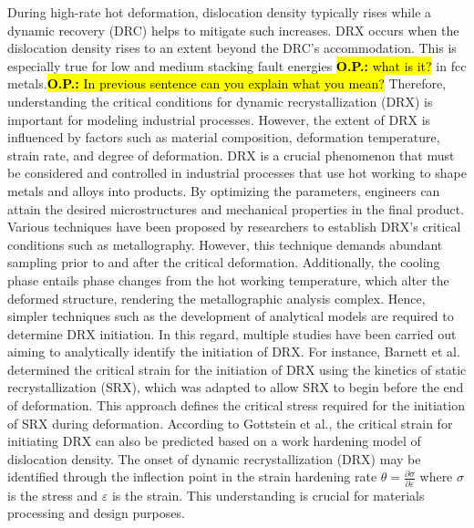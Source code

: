 \documentclass[metals,article,submit,pdftex,moreauthors]{Definitions/mdpi}
\makeatletter
\DeclareRobustCommand{\eal}{et al.\@\xspace}
\DeclareRobustCommand{\OP}[1]{\begingroup\sethlcolor{VWyellow}\textcolor{red}{\hl{\textbf{O.P.:} #1}}\endgroup}
\DeclareRobustCommand{\OPP}[1]{\begingroup\sethlcolor{VWyellow}\textcolor{red}{\hl{\textbf{O.P.:} In previous sentence #1}}\endgroup}
\makeatother
\begin{document}
During high-rate hot deformation, dislocation density typically rises while a dynamic recovery (DRC) helps to mitigate such increases.
DRX occurs when the dislocation density rises to an extent beyond the DRC’s accommodation.
This is especially true for low and medium stacking fault energies \OP{what is it?} in fcc metals.\OPP{can you explain what you mean?}
Therefore, understanding the critical conditions for dynamic recrystallization (DRX) is important for modeling industrial processes.
However, the extent of DRX is influenced by factors such as material composition, deformation temperature, strain rate, and degree of deformation.
DRX is a crucial phenomenon that must be considered and controlled in industrial processes that use hot working to shape metals and alloys into products.
By optimizing the parameters, engineers can attain the desired microstructures and mechanical properties in the final product.
Various techniques have been proposed by researchers to establish DRX's critical conditions such as metallography.
However, this technique demands abundant sampling prior to and after the critical deformation.
Additionally, the cooling phase entails phase changes from the hot working temperature, which alter the deformed structure, rendering the metallographic analysis complex.
Hence, simpler techniques such as the development of analytical models are required to determine DRX initiation.
In this regard, multiple studies have been carried out aiming to analytically identify the initiation of DRX.
For instance, Barnett \eal \cite{barnett2000predicting} determined the critical strain for the initiation of DRX using the kinetics of static recrystallization (SRX), which was adapted to allow SRX to begin before the end of deformation.
This approach defines the critical stress required for the initiation of SRX during deformation.
According to Gottstein \eal \cite{gottstein2004prediction}, the critical strain for initiating DRX can also be predicted based on a work hardening model of dislocation density.
The onset of dynamic recrystallization (DRX) may be identified through the inflection point in the strain hardening rate $\theta=\frac{\partial \sigma}{\partial \varepsilon}$ where $\sigma$ is the stress and $\varepsilon$ is the strain.
This understanding is crucial for materials processing and design purposes.
\end{document}
